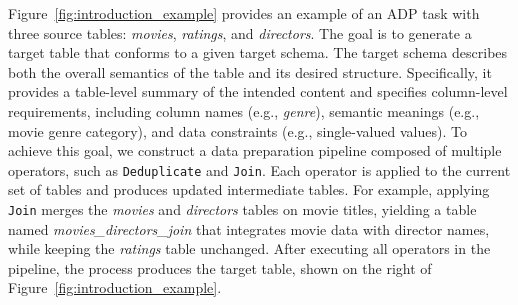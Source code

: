 \begin{example}
Figure~\ref{fig:introduction_example} provides an example of an ADP task with three source tables: \textit{movies}, \textit{ratings}, and \textit{directors}. The goal is to generate a target table that conforms to a given target schema. The target schema describes both the overall semantics of the table and its desired structure. Specifically, it provides a table-level summary of the intended content and specifies column-level requirements, including column names (e.g., \textit{genre}), semantic meanings (e.g., movie genre category), and data constraints (e.g., single-valued values).
To achieve this goal, we construct a data preparation pipeline composed of multiple operators, such as \texttt{Deduplicate} and \texttt{Join}. Each operator is applied to the current set of tables and produces updated intermediate tables. For example, applying \texttt{Join} merges the \textit{movies} and \textit{directors} tables on movie titles, yielding a table named \textit{movies\_directors\_join} that integrates movie data with director names, while keeping the \textit{ratings} table unchanged.
After executing all operators in the pipeline, the process produces the target table, shown on the right of Figure~\ref{fig:introduction_example}. 
\end{example}

